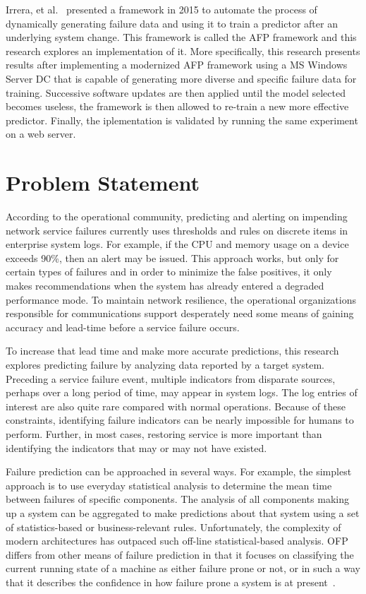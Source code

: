 Irrera, et al.~\cite{irrera2015} presented a framework in 2015 to automate the
process of dynamically generating failure data and using it to train a
predictor after an underlying system change.  This framework is called the
\ac{AFP} framework and this research explores an implementation of it.  More
specifically, this research presents results after implementing a modernized
\ac{AFP} framework using a \ac{MS} Windows Server \ac{DC} that is capable of
generating more diverse and specific failure data for training.  Successive
software updates are then applied until the model selected becomes useless, the
framework is then allowed to re-train a new more effective predictor.  Finally,
the iplementation is validated by running the same experiment on a web server.

\section{Problem Statement}
According to the operational community, predicting and alerting on impending
network service failures currently uses thresholds and rules on discrete items
in enterprise system logs.  For example, if the \ac{CPU} and memory usage on a
device exceeds 90\%, then an alert may be issued.  This approach works, but
only for certain types of failures and in order to minimize the false
positives, it only makes recommendations when the system has already entered a
degraded performance mode.  To maintain network resilience, the operational
organizations responsible for communications support desperately need some
means of gaining accuracy and lead-time before a service failure occurs.  

To increase that lead time and make more accurate predictions, this research
explores predicting failure by analyzing data reported by a target system.
Preceding a service failure event, multiple indicators from disparate sources,
perhaps over a long period of time, may appear in system logs.  The log entries
of interest are also quite rare compared with normal operations.  Because of
these constraints, identifying failure indicators can be nearly impossible for
humans to perform.  Further, in most cases, restoring service is more important
than identifying the indicators that may or may not have existed.  

Failure prediction can be approached in several ways. For example, the simplest
approach is to use everyday statistical analysis to determine the mean time
between failures of specific components. The analysis of all components making
up a system can be aggregated to make predictions about that system using a set
of statistics-based or business-relevant rules.  Unfortunately, the complexity
of modern architectures has outpaced such off-line statistical-based analysis.
\ac{OFP} differs from other means of failure prediction in that it focuses on
classifying the current running state of a machine as either failure prone or
not, or in such a way that it describes the confidence in how failure prone a
system is at present~\cite{salfnerSurvey}.

